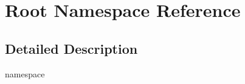 \hypertarget{namespaceRoot}{}\section{Root Namespace Reference}
\label{namespaceRoot}


\subsection{Detailed Description}
namespace 
